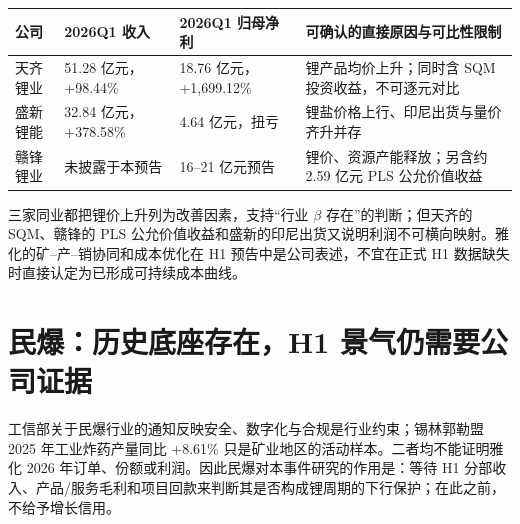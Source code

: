 \begin{exhibitbox}[三家同业的 2026Q1 信号]
\begin{tabularx}{\exhibitboxwidth}{L{2.1cm}R{2.6cm}R{2.8cm}X}
\toprule
公司 & 2026Q1 收入 & 2026Q1 归母净利 & 可确认的直接原因与可比性限制 \\
\midrule
天齐锂业 & 51.28 亿元，+98.44\% & 18.76 亿元，+1,699.12\% & 锂产品均价上升；同时含 SQM 投资收益，不可逐元对比 \\
盛新锂能 & 32.84 亿元，+378.58\% & 4.64 亿元，扭亏 & 锂盐价格上行、印尼出货与量价齐升并存 \\
赣锋锂业 & 未披露于本预告 & 16--21 亿元预告 & 锂价、资源产能释放；另含约 2.59 亿元 PLS 公允价值收益 \\
\bottomrule
\end{tabularx}
\end{exhibitbox}

三家同业都把锂价上升列为改善因素，支持“行业 $\beta$ 存在”的判断；但天齐的 SQM、赣锋的 PLS 公允价值收益和盛新的印尼出货又说明利润不可横向映射。雅化的矿--产--销协同和成本优化在 H1 预告中是公司表述，不宜在正式 H1 数据缺失时直接认定为已形成可持续成本曲线。

\section{民爆：历史底座存在，H1 景气仍需要公司证据}

工信部关于民爆行业的通知反映安全、数字化与合规是行业约束；锡林郭勒盟 2025 年工业炸药产量同比 +8.61\% 只是矿业地区的活动样本。二者均不能证明雅化 2026 年订单、份额或利润。因此民爆对本事件研究的作用是：等待 H1 分部收入、产品/服务毛利和项目回款来判断其是否构成锂周期的下行保护；在此之前，不给予增长信用。
